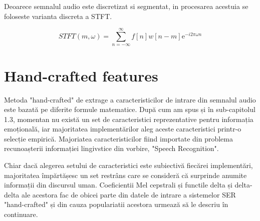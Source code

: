 \documentclass[a4paper,12pt]{book}
\begin{document}
			Deoarece semnalul audio este discretizat si segmentat, in procesarea acestuia se foloseste varianta discreta a STFT.
			
			\begin{equation}
			STFT(m ,\omega) = \sum_{n=-\infty}^{\infty}  f[n] w[n-m]\mathrm{e}^{- i 2\pi \omega n}  \label{stft}
			\end{equation}
			
			
			\section{Hand-crafted features} \label{hand-crafted}
			
			Metoda "hand-crafted" de extrage a caracteristicilor de intrare din semnalul audio este bazată pe diferite formule matematice. După cum am spus și în sub-capitolul 1.3, momentan nu există un set de caracteristici reprezentative pentru informația emoțională, iar majoritatea implementărilor aleg aceste caracteristici printr-o selecție empirică. Majoriatea caracteristicilor fiind importate din problema recunoașterii informației lingivstice din vorbire, "Speech Recognition". \par 
			Chiar dacă alegerea setului de caracteristici este subiectivă fiecărei implementări, majoritatea împărtășesc un set restrâns care se consideră că surprinde anumite informații din discursul uman. Coeficientii Mel cepstrali și functile delta și delta-delta ale acestora fac de obicei parte din datele de intrare a sistemelor SER "hand-crafted" și din cauza populariatii acestora urmează să le descriu în continuare. \par
			
\end{document}
